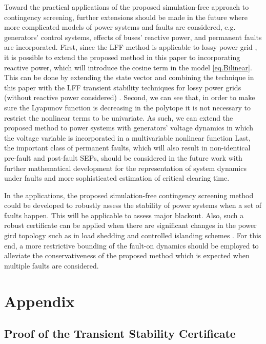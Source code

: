 \documentclass[final]{IEEEtran}
\begin{document}
Toward the practical applications of the proposed simulation-free
approach to contingency screening, further extensions should be
made in the future where more complicated models of power systems
and faults are considered,
  e.g. generators' control systems, effects of buses' reactive power, and permanent faults are incorporated.
First, since the LFF method is applicable to lossy power grid
\cite{VuTuritsyn:2014acc}, it is possible to extend the proposed
method in this paper to incorporating reactive power, which will
introduce the cosine term in the model \eqref{eq.Bilinear}. This
can be done by extending the state vector  and combining the
technique in this paper with the LFF transient stability
techniques for lossy power grids (without reactive power
considered) \cite{VuTuritsyn:2014acc}. Second, we can see that, in
order to make sure the Lyapunov function is decreasing in the
polytope  it is not necessary to restrict the
nonlinear terms  to be univariate. As such, we can extend
the proposed method to power systems with generators' voltage
dynamics in which the voltage variable is incorporated in a
multivariable nonlinear function  Last, the important class of
permanent faults, which will also result in non-identical
pre-fault and post-fault SEPs, should be considered in the future
work with further mathematical development for the representation
of system dynamics under faults and more sophisticated estimation
of critical clearing time.

In the applications, the proposed simulation-free contingency
screening method could be developed to robustly assess the
stability of power systems when a set of faults happen. This will
be applicable to assess major blackout. Also, such a robust
certificate can be applied when there are significant changes in
the power gird topology such as in load shedding
\cite{7077021,siddiqui2015preventive,5706912} and controlled
islanding schemes
\cite{januszquiros2014constrained,6774471,6980139,7024905,pfitzner2011controlled}.
For this end, a more restrictive bounding of the fault-on dynamics
should be employed to alleviate the conservativeness of the
proposed method which is expected when multiple faults are
considered.





\section{Appendix}

\subsection{Proof of the Transient Stability Certificate}
\label{appen.NewQKH}
\end{document}
